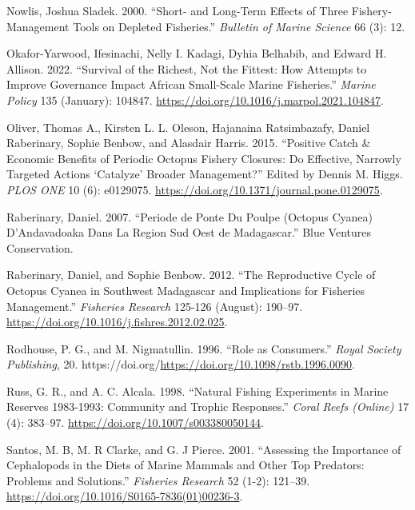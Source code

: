 \documentclass[
]{article}
\newlength{\cslhangindent}
\newlength{\cslentryspacingunit} %
\newenvironment{CSLReferences}[2] %
 {%
  \setlength{\parindent}{0pt}
  \ifodd #1
  \let\oldpar\par
  \def\par{\hangindent=\cslhangindent\oldpar}
  \fi
  \setlength{\parskip}{#2\cslentryspacingunit}
 }%
 {}
\begin{document}
\begin{CSLReferences}{1}{0}
\leavevmode{}%
Nowlis, Joshua Sladek. 2000. {``Short- and Long-Term Effects of Three Fishery-Management Tools on Depleted Fisheries.''} \emph{Bulletin of Marine Science} 66 (3): 12.

\leavevmode{}%
Okafor-Yarwood, Ifesinachi, Nelly I. Kadagi, Dyhia Belhabib, and Edward H. Allison. 2022. {``Survival of the {Richest}, Not the {Fittest}: {How} Attempts to Improve Governance Impact {African} Small-Scale Marine Fisheries.''} \emph{Marine Policy} 135 (January): 104847. \url{https://doi.org/10.1016/j.marpol.2021.104847}.

\leavevmode{}%
Oliver, Thomas A., Kirsten L. L. Oleson, Hajanaina Ratsimbazafy, Daniel Raberinary, Sophie Benbow, and Alasdair Harris. 2015. {``Positive {Catch} \& {Economic} {Benefits} of {Periodic} {Octopus} {Fishery} {Closures}: {Do} {Effective}, {Narrowly} {Targeted} {Actions} {`{Catalyze}'} {Broader} {Management}?''} Edited by Dennis M. Higgs. \emph{PLOS ONE} 10 (6): e0129075. \url{https://doi.org/10.1371/journal.pone.0129075}.

\leavevmode{}%
Raberinary, Daniel. 2007. {``Periode de Ponte Du Poulpe ({Octopus} Cyanea) {D}'{Andavadoaka} Dans La Region Sud Oest de {Madagascar}.''} Blue Ventures Conservation.

\leavevmode{}%
Raberinary, Daniel, and Sophie Benbow. 2012. {``The Reproductive Cycle of {Octopus} Cyanea in Southwest {Madagascar} and Implications for Fisheries Management.''} \emph{Fisheries Research} 125-126 (August): 190--97. \url{https://doi.org/10.1016/j.fishres.2012.02.025}.

\leavevmode{}%
Rodhouse, P. G., and M. Nigmatullin. 1996. {``Role as Consumers.''} \emph{Royal Society Publishing}, 20. https://doi.org/\url{https://doi.org/10.1098/rstb.1996.0090}.

\leavevmode{}%
Russ, G. R., and A. C. Alcala. 1998. {``Natural Fishing Experiments in Marine Reserves 1983-1993: Community and Trophic Responses.''} \emph{Coral Reefs (Online)} 17 (4): 383--97. \url{https://doi.org/10.1007/s003380050144}.

\leavevmode{}%
Santos, M. B, M. R Clarke, and G. J Pierce. 2001. {``Assessing the Importance of Cephalopods in the Diets of Marine Mammals and Other Top Predators: Problems and Solutions.''} \emph{Fisheries Research} 52 (1-2): 121--39. \url{https://doi.org/10.1016/S0165-7836(01)00236-3}.


\end{CSLReferences}
\end{document}
